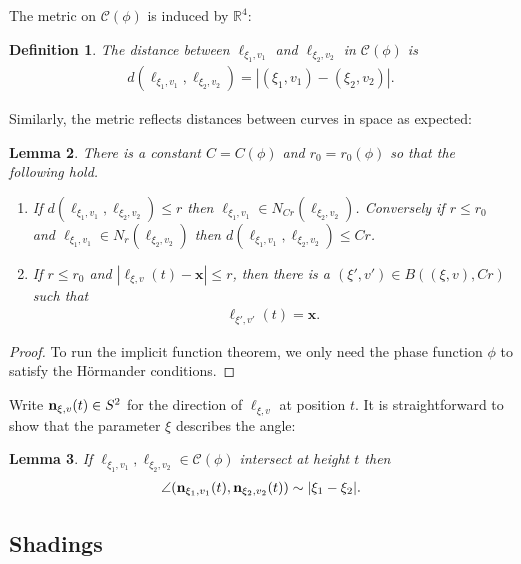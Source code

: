 \documentclass[12pt]{amsart}
\newcommand{\x}{{\bf{x}}}
\numberwithin{equation}{section}
\newtheorem{lemma}{Lemma}[section]
\newtheorem{definition}[lemma]{Definition}
\newcommand{\bn}{\mathbf{n}}
\newcommand{\cC}{\mathcal C}
\renewcommand{\bn}{{\bf n}}
\renewcommand{\cC}{{\mathcal C}}
\newcommand{\R}{\mathbb{R}}
\newcommand{\1}{\mathbbm{1}}
\renewcommand{\x}{\mathbf x}
\begin{document}
The metric on $\cC(\phi)$ is induced by $\R^4$: 
\begin{definition}
    The distance between $\ell_{\xi_1,v_1}$ and $\ell_{\xi_2,v_2}$ in $\cC(\phi)$ is 
    \begin{align}
        d(\ell_{\xi_1,v_1}, \ell_{\xi_2,v_2}) = |(\xi_1,v_1) - (\xi_2,v_2)|. 
    \end{align}
\end{definition}
Similarly, the metric reflects distances between curves in space as expected: 
\begin{lemma}\label{lem: metric on C(phi)}
    There is a constant $C = C(\phi)$ and $r_0 = r_0(\phi)$ so that the following hold. 
    \begin{enumerate}
        \item If $d(\ell_{\xi_1,v_1}, \ell_{\xi_2,v_2}) \leq r$ then  $\ell_{\xi_1,v_1} \in N_{Cr}(\ell_{\xi_2,v_2})$. Conversely if $r \leq  r_0$ and $\ell_{\xi_1,v_1} \in N_{r}(\ell_{\xi_2,v_2})$ then $d(\ell_{\xi_1,v_1}, \ell_{\xi_2,v_2}) \leq Cr$. 
        \item If $r \leq r_0$ and $|\ell_{\xi,v}(t) - \x| \leq r$, then there is a $(\xi',v') \in B((\xi,v), Cr)$ such that 
        \begin{align}
            \ell_{\xi',v'}(t) = \x. 
        \end{align}
    \end{enumerate}
\end{lemma}

\begin{proof}
    To run the implicit function theorem, we only need the phase function $\phi$ to satisfy the H\"ormander conditions.
\end{proof}

Write $\bn_{\xi,v}(t) \in S^2$ for the direction of $\ell_{\xi,v}$ at position $t$. 
It is straightforward to show that the parameter $\xi$ describes the angle: 
\begin{lemma}
    If $\ell_{\xi_1,v_1}, \ell_{\xi_2,v_2} \in \cC(\phi)$ intersect at height $t$ then 
    \begin{align}
        \angle(\bn_{\xi_1,v_1}(t), \bn_{\xi_2,v_2}(t)) \sim |\xi_1 - \xi_2|. 
    \end{align}
\end{lemma}

\subsection{Shadings}
\end{document}

